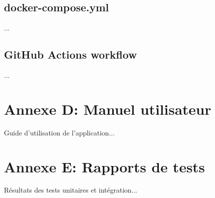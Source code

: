 \documentclass[12pt,a4paper]{report}
\begin{document}
\subsection{docker-compose.yml}
...

\subsection{GitHub Actions workflow}
...

\section{Annexe D: Manuel utilisateur}
Guide d'utilisation de l'application...

\section{Annexe E: Rapports de tests}
Résultats des tests unitaires et intégration...
\end{document}
